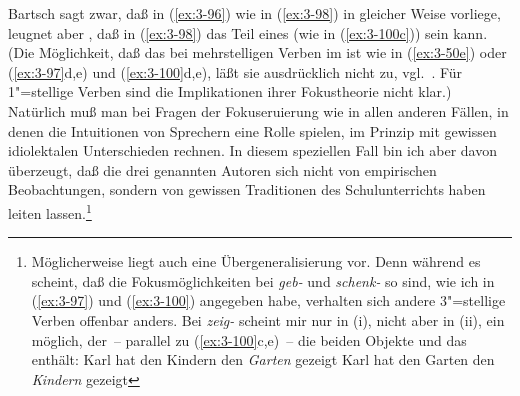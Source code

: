 \documentclass[output=paper]{langsci/langscibook}
\begin{document}
Bartsch sagt zwar, daß in (\ref{ex:3-96}) wie in (\ref{ex:3-98}) in gleicher Weise
 vorliege, leugnet aber
\citep[523]{Bartsch76}, daß in (\ref{ex:3-98}) das  Teil eines 
(wie in (\ref{ex:3-100c})) sein kann. (Die Möglichkeit, daß das  bei mehrstelligen Verben im  ist wie in (\ref{ex:3-50e}) oder (\ref{ex:3-97}d,e) und
(\ref{ex:3-100}d,e), läßt sie ausdrücklich nicht zu,
vgl.\ \citet[522]{Bartsch76}. Für 1"=stellige Verben sind die
Implikationen ihrer Fokustheorie nicht klar.) Natürlich muß man bei
Fragen der Fokuseruierung wie in allen anderen Fällen, in denen die
Intuitionen von Sprechern eine Rolle spielen, im Prinzip mit gewissen
idiolektalen Unterschieden rechnen. In diesem speziellen Fall bin ich
aber davon überzeugt, daß die drei genannten Autoren sich nicht von
empirischen Beobachtungen, sondern von gewissen Traditionen des
Schulunterrichts haben leiten lassen.\footnote{\label{fn:3-21}%
    Möglicherweise liegt auch eine Übergeneralisierung vor. Denn während
  es scheint, daß die Fokusmöglichkeiten bei \textit{geb-} und
  \textit{schenk-} so sind, wie ich in (\ref{ex:3-97}) und (\ref{ex:3-100}) angegeben habe,
  verhalten sich andere 3"=stellige Verben offenbar anders. Bei \textit{zeig-}
  \zb scheint mir nur in (i), nicht aber in (ii), ein  möglich,
  der~-- parallel zu (\ref{ex:3-100}c,e)~-- die beiden Objekte und das 
  enthält:
  \ea
  \label{ex:3-i3}
  Karl hat den Kindern den \textit{Garten} gezeigt
  \ex
  \label{ex:3-ii3}
  Karl hat den Garten den \textit{Kindern} gezeigt
  \zlast%
}
\end{document}

